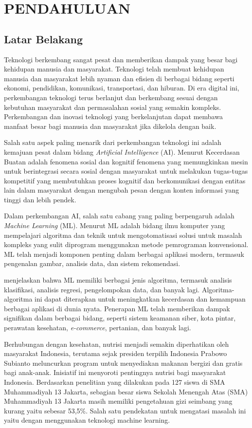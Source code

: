 \chapter{PENDAHULUAN}

\section{Latar Belakang}
Teknologi berkembang sangat pesat dan memberikan dampak yang besar bagi kehidupan manusia dan masyarakat. Teknologi telah membuat kehidupan manusia dan masyarakat lebih nyaman dan efisien di berbagai bidang seperti ekonomi, pendidikan, komunikasi, transportasi, dan hiburan. Di era digital ini, perkembangan teknologi terus berlanjut dan berkembang sesuai dengan kebutuhan masyarakat dan permasalahan sosial yang semakin kompleks. Perkembangan dan inovasi teknologi yang berkelanjutan dapat membawa manfaat besar bagi manusia dan masyarakat jika dikelola dengan baik.

Salah satu aspek paling menarik dari perkembangan teknologi ini adalah kemajuan pesat dalam bidang \textit{Artificial Intelligence} (AI). Menurut \cite{abbas2021} Kecerdasan Buatan adalah fenomena sosial dan kognitif fenomena yang memungkinkan mesin untuk berintegrasi secara sosial dengan masyarakat untuk melakukan tugas-tugas kompetitif yang membutuhkan proses kognitif dan berkomunikasi dengan entitas lain dalam masyarakat dengan mengubah pesan dengan konten informasi yang tinggi dan lebih pendek.

Dalam perkembangan AI, salah satu cabang yang paling berpengaruh adalah \textit{Machine Learning} (ML). Menurut \cite{rebala2019} ML adalah bidang ilmu komputer yang mempelajari algoritma dan teknik untuk mengotomatisasi solusi untuk masalah kompleks yang sulit diprogram menggunakan metode pemrograman konvensional. ML telah menjadi komponen penting dalam berbagai aplikasi modern, termasuk pengenalan gambar, analisis data, dan sistem rekomendasi.

\cite{Sarker2021} menjelaskan bahwa ML memiliki berbagai jenis algoritma, termasuk analisis klasifikasi, analisis regresi, pengelompokan data, dan banyak lagi. Algoritma-algoritma ini dapat diterapkan untuk meningkatkan kecerdasan dan kemampuan berbagai aplikasi di dunia nyata. Penerapan ML telah memberikan dampak signifikan dalam berbagai bidang, seperti sistem keamanan siber, kota pintar, perawatan kesehatan, \textit{e-commerce}, pertanian, dan banyak lagi.

Berhubungan dengan kesehatan, nutrisi menjadi semakin diperhatikan oleh masyarakat Indonesia, terutama sejak presiden terpilih Indonesia Prabowo Subianto meluncurkan program untuk menyediakan makanan bergizi dan gratis bagi anak-anak. Inisiatif ini menyoroti pentingnya nutrisi bagi masyarakat Indonesia. Berdasarkan penelitian \cite{fitria2022} yang dilakukan pada 127 siswa di SMA Muhammadiyah 13 Jakarta, sebagian besar siswa Sekolah Menengah Atas (SMA)  Muhammadiyah 13 Jakarta masih memiliki pengetahuan gizi seimbang yang kurang yaitu sebesar 53,5\%. Salah satu pendekatan untuk mengatasi masalah ini yaitu dengan menggunakan teknologi machine learning.

